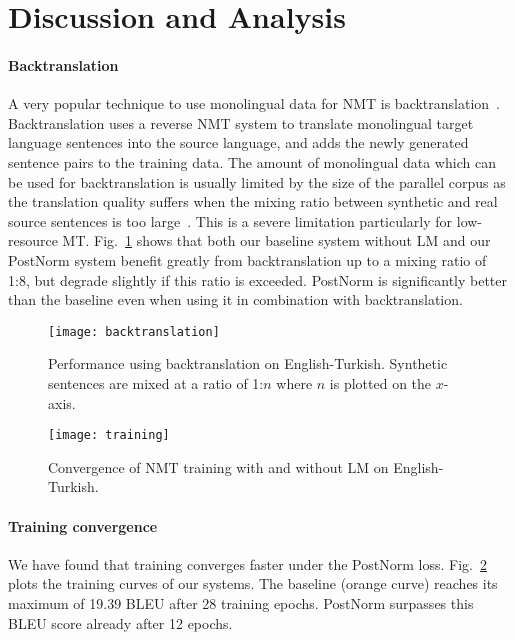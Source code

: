 \documentclass[11pt,a4paper]{article}
\begin{document}
\section{Discussion and Analysis}

\paragraph{Backtranslation}

A very popular technique to use monolingual data for NMT is backtranslation~\citep{backtranslation}. Backtranslation uses a reverse NMT system to translate monolingual target language sentences into the source language, and adds the newly generated sentence pairs to the training data. The amount of monolingual data which can be used for backtranslation is usually limited by the size of the parallel corpus as the translation quality suffers when the mixing ratio between synthetic and real source sentences is too large~\citep{investigating-backtranslation}. This is a severe limitation particularly for low-resource MT. Fig.~\ref{fig:backtranslation} shows that both our baseline system without LM and our {\sc PostNorm} system benefit greatly from backtranslation up to a mixing ratio of 1:8, but degrade slightly if this ratio is exceeded. {\sc PostNorm} is significantly better than the baseline even when using it in combination with backtranslation.


\begin{figure}[t!]
\centering
\texttt{[image: backtranslation]}
\caption{Performance using backtranslation on English-Turkish. Synthetic sentences are mixed at a ratio of 1:$n$ where $n$ is plotted on the $x$-axis.}\label{fig:backtranslation}
\end{figure}

\begin{figure}[t!]
\centering
\texttt{[image: training]}
\caption{Convergence of NMT training with and without LM on English-Turkish.}\label{fig:training}
\end{figure}


\paragraph{Training convergence}

We have found that training converges faster under the {\sc PostNorm} loss. Fig.~\ref{fig:training} plots the training curves of our systems. The baseline (orange curve) reaches its maximum of 19.39 BLEU after 28 training epochs. {\sc PostNorm} surpasses this BLEU score already after 12 epochs.
\end{document}
